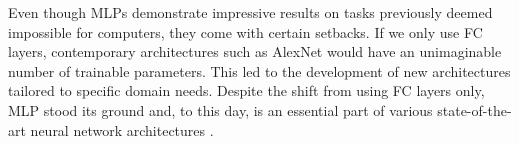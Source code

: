 

Even though MLPs demonstrate impressive results on tasks previously deemed impossible for computers, they come with certain setbacks.
If we only use FC layers, contemporary architectures such as AlexNet \cite{alexnet} would have an unimaginable number of trainable parameters.
This led to the development of new architectures tailored to specific domain needs.
Despite the shift from using FC layers only, MLP stood its ground and, to this day, is an essential part of various state-of-the-art neural network architectures \cite{alexnet}.

